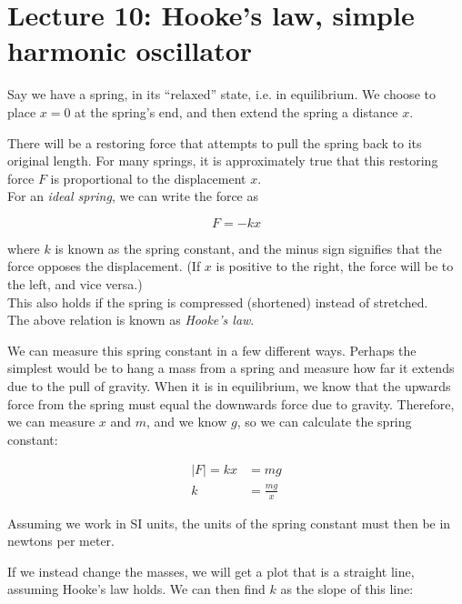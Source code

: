 
\section{Lecture 10: Hooke's law, simple harmonic oscillator}

Say we have a spring, in its ``relaxed'' state, i.e. in equilibrium. We choose to place $x = 0$ at the spring's end, and then extend the spring a distance $x$.

There will be a restoring force that attempts to pull the spring back to its original length. For many springs, it is approximately true that this restoring force $F$ is proportional to the displacement $x$.\\
For an \emph{ideal spring}, we can write the force as

\begin{equation}
F = -k x
\end{equation}

where $k$ is known as the spring constant, and the minus sign signifies that the force opposes the displacement. (If $x$ is positive to the right, the force will be to the left, and vice versa.)\\
This also holds if the spring is compressed (shortened) instead of stretched.\\
The above relation is known as \emph{Hooke's law}.

We can measure this spring constant in a few different ways. Perhaps the simplest would be to hang a mass from a spring and measure how far it extends due to the pull of gravity. When it is in equilibrium, we know that the upwards force from the spring must equal the downwards force due to gravity. Therefore, we can measure $x$ and $m$, and we know $g$, so we can calculate the spring constant:

\begin{align}
|F| = k x &= m g\\
k &= \frac{m g}{x}
\end{align}

Assuming we work in SI units, the units of the spring constant must then be in newtons per meter.

If we instead change the masses, we will get a plot that is a straight line, assuming Hooke's law holds. We can then find $k$ as the slope of this line:


